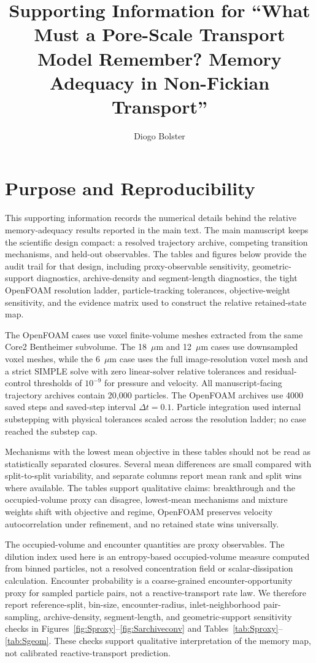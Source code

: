 \documentclass[11pt]{article}
\title{Supporting Information for ``What Must a Pore-Scale Transport Model Remember? Memory Adequacy in Non-Fickian Transport''}
\author{Diogo Bolster}
\date{}
\begin{document}
\maketitle

\section*{Purpose and Reproducibility}

This supporting information records the numerical details behind the relative memory-adequacy results reported in the main text. The main manuscript keeps the scientific design compact: a resolved trajectory archive, competing transition mechanisms, and held-out observables. The tables and figures below provide the audit trail for that design, including proxy-observable sensitivity, geometric-support diagnostics, archive-density and segment-length diagnostics, the tight OpenFOAM resolution ladder, particle-tracking tolerances, objective-weight sensitivity, and the evidence matrix used to construct the relative retained-state map.

The OpenFOAM cases use voxel finite-volume meshes extracted from the same Core2 Bentheimer subvolume. The 18~$\mu$m and 12~$\mu$m cases use downsampled voxel meshes, while the 6~$\mu$m case uses the full image-resolution voxel mesh and a strict SIMPLE solve with zero linear-solver relative tolerances and residual-control thresholds of $10^{-9}$ for pressure and velocity. All manuscript-facing trajectory archives contain 20,000 particles. The OpenFOAM archives use 4000 saved steps and saved-step interval $\Delta t=0.1$. Particle integration used internal substepping with physical tolerances scaled across the resolution ladder; no case reached the substep cap.

Mechanisms with the lowest mean objective in these tables should not be read as statistically separated closures. Several mean differences are small compared with split-to-split variability, and separate columns report mean rank and split wins where available. The tables support qualitative claims: breakthrough and the occupied-volume proxy can disagree, lowest-mean mechanisms and mixture weights shift with objective and regime, OpenFOAM preserves velocity autocorrelation under refinement, and no retained state wins universally.

The occupied-volume and encounter quantities are proxy observables. The dilution index used here is an entropy-based occupied-volume measure computed from binned particles, not a resolved concentration field or scalar-dissipation calculation. Encounter probability is a coarse-grained encounter-opportunity proxy for sampled particle pairs, not a reactive-transport rate law. We therefore report reference-split, bin-size, encounter-radius, inlet-neighborhood pair-sampling, archive-density, segment-length, and geometric-support sensitivity checks in Figures~\ref{fig:Sproxy}--\ref{fig:Sarchiveconv} and Tables~\ref{tab:Sproxy}--\ref{tab:Sgeom}. These checks support qualitative interpretation of the memory map, not calibrated reactive-transport prediction.
\end{document}
